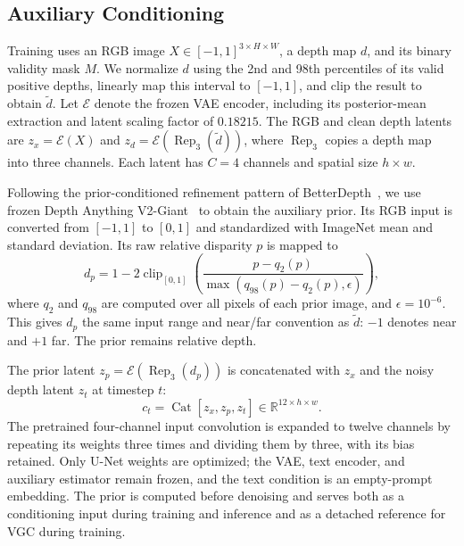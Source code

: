\documentclass[10pt,journal,a4paper]{IEEEtran}
\begin{document}
\subsection{Auxiliary Conditioning}
\label{sec:conditioning}
Training uses an RGB image $X\in[-1,1]^{3\times H\times W}$, a depth map $d$, and its binary validity mask $M$. We normalize $d$ using the 2nd and 98th percentiles of its valid positive depths, linearly map this interval to $[-1,1]$, and clip the result to obtain $\tilde d$. Let $\mathcal E$ denote the frozen VAE encoder, including its posterior-mean extraction and latent scaling factor of $0.18215$. The RGB and clean depth latents are $z_x=\mathcal E(X)$ and $z_d=\mathcal E(\operatorname{Rep}_3(\tilde d))$, where $\operatorname{Rep}_3$ copies a depth map into three channels. Each latent has $C=4$ channels and spatial size $h\times w$.

Following the prior-conditioned refinement pattern of BetterDepth~\cite{zhang2024betterdepth}, we use frozen Depth Anything V2-Giant~\cite{Li2024DepthV2} to obtain the auxiliary prior. Its RGB input is converted from $[-1,1]$ to $[0,1]$ and standardized with ImageNet mean and standard deviation. Its raw relative disparity $p$ is mapped to
\begin{equation}
	d_p=1-2\operatorname{clip}_{[0,1]}
	\left(\frac{p-q_2(p)}{\max(q_{98}(p)-q_2(p),\epsilon)}\right),
	\label{eq:prior_norm}
\end{equation}
where $q_2$ and $q_{98}$ are computed over all pixels of each prior image, and $\epsilon=10^{-6}$. This gives $d_p$ the same input range and near/far convention as $\tilde d$: $-1$ denotes near and $+1$ far. The prior remains relative depth.

The prior latent $z_p=\mathcal E(\operatorname{Rep}_3(d_p))$ is concatenated with $z_x$ and the noisy depth latent $z_t$ at timestep $t$:
\begin{equation}
	c_t=\operatorname{Cat}[z_x,z_p,z_t]\in\mathbb R^{12\times h\times w}.
	\label{eq:conditioning}
\end{equation}
The pretrained four-channel input convolution is expanded to twelve channels by repeating its weights three times and dividing them by three, with its bias retained. Only U-Net weights are optimized; the VAE, text encoder, and auxiliary estimator remain frozen, and the text condition is an empty-prompt embedding. The prior is computed before denoising and serves both as a conditioning input during training and inference and as a detached reference for VGC during training.
\end{document}
